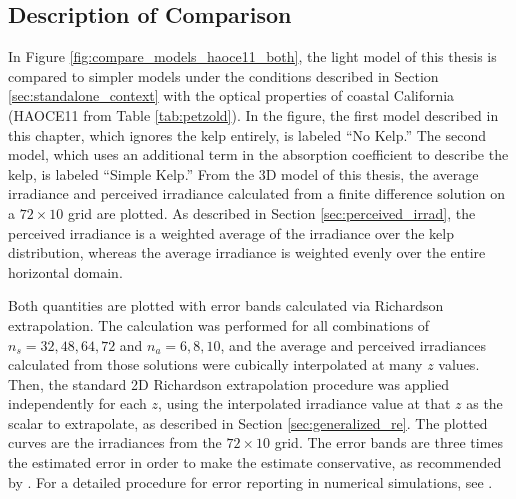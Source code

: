 \subsection{Description of Comparison}
In Figure \ref{fig:compare_models_haoce11_both}, the light model of this thesis is compared to simpler models under the conditions described in Section \ref{sec:standalone_context} with the optical properties of coastal California (HAOCE11 from Table \ref{tab:petzold}).
In the figure, the first model described in this chapter, which ignores the kelp entirely, is labeled ``No Kelp.''
The second model, which uses an additional term in the absorption coefficient to describe the kelp, is labeled ``Simple Kelp.''
From the 3D model of this thesis, the average irradiance and perceived irradiance calculated from a finite difference solution on a $72\times10$ grid are plotted.
As described in Section \ref{sec:perceived_irrad}, the perceived irradiance is a weighted average of the irradiance over the kelp distribution, whereas the average irradiance is weighted evenly over the entire horizontal domain.

Both quantities are plotted with error bands calculated via Richardson extrapolation.
The calculation was performed for all combinations of $n_s=32,48,64,72$ and $n_a=6,8,10$, and the average and perceived irradiances calculated from those solutions were cubically interpolated at many $z$ values.
Then, the standard 2D Richardson extrapolation procedure was applied independently for each $z$, using the interpolated irradiance value at that $z$ as the scalar to extrapolate, as described in Section \ref{sec:generalized_re}.
The plotted curves are the irradiances from the $72\times 10$ grid.
The error bands are three times the estimated error in order to make the estimate conservative, as recommended by \cite{roache_perspective:_1994}.
For a detailed procedure for error reporting in numerical simulations, see \cite{noauthor_procedure_2008}.

